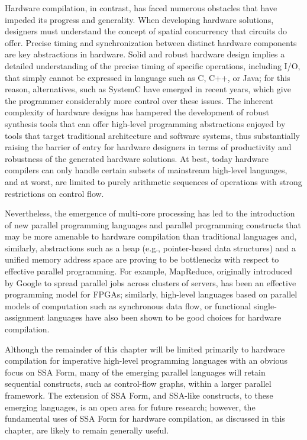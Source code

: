Hardware compilation, in contrast, has faced numerous obstacles that have impeded its progress and generality. 
When developing hardware solutions, designers must understand the concept of spatial concurrency that circuits do offer. 
Precise timing and synchronization between distinct hardware components are key abstractions in hardware. 
Solid and robust hardware design implies a detailed understanding of the precise timing of specific operations, including I/O, that simply cannot be expressed in language such as C, C++, or Java; 
for this reason, alternatives, such as SystemC have emerged in recent years, which give the programmer considerably more control over these issues. 
The inherent complexity of hardware designs has hampered the development of robust synthesis tools that can offer high-level programming abstractions enjoyed by tools that target traditional architecture and software systems, thus substantially raising the barrier of entry for hardware designers in terms of productivity and robustness of the generated hardware solutions. 
At best, today hardware compilers can only handle certain subsets of mainstream high-level languages, and at worst, are limited to purely arithmetic sequences of operations with strong restrictions on control flow.

Nevertheless, the emergence of multi-core processing has led to the introduction of new parallel programming languages and parallel programming constructs that may be more amenable to hardware compilation than traditional languages and, similarly, abstractions such as a heap (e.g., pointer-based data structures) and a unified memory address space are proving to be bottlenecks with respect to effective parallel programming. 
For example, MapReduce, originally introduced by Google to spread parallel jobs across clusters of servers, has been an effective programming model for FPGAs; 
similarly, high-level languages based on parallel models of computation such as synchronous data flow, or functional single-assignment languages have also been shown to be good choices for hardware compilation.

Although the remainder of this chapter will be limited primarily to hardware compilation for imperative high-level programming languages with an obvious focus on SSA Form, many of the emerging parallel languages will retain sequential constructs, such as control-flow graphs, within a larger parallel framework. 
The extension of SSA Form, and SSA-like constructs, to these emerging languages, is an open area for future research; 
however, the fundamental uses of SSA Form for hardware compilation, as discussed in this chapter, are likely to remain generally useful.


